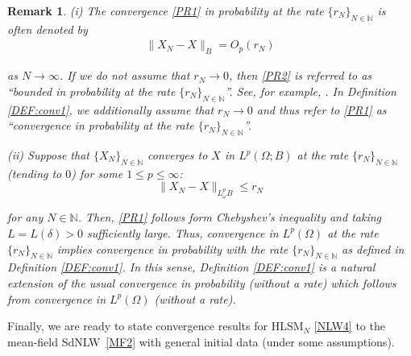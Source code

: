 \documentclass[letterpaper, 11pt,  reqno]{amsart}
\newtheorem{remark}[theorem]{Remark}
\newcommand{\1}{\hspace{0.5mm}\text{I}\hspace{0.2mm}}
\newcommand{\noi}{\noindent}
\newcommand{\N}{\mathbb{N}}
\newcommand{\dl}{\delta}
\newcommand{\HLS}{$\text{HLSM}_N$ }
\renewcommand{\O}{\Omega}
\renewcommand{\o}{\omega}
\numberwithin{equation}{section}
\numberwithin{theorem}{section}
\begin{document}
\begin{remark}\label{REM:conv2}\rm
(i) The  convergence 
\eqref{PR1}
in probability at the rate
$\{r_N\}_{N \in \N}$
is often  denoted by 
\begin{align}
 \|X_N - X\|_B = O_p(r_N)
 \label{PR2}
\end{align}

\noi
as $N \to \infty$.
If we do not assume that $r_N\to 0$, 
then  \eqref{PR2}
is referred to as 
``bounded
in probability at the rate  
$\{r_N\}_{N \in \N}$''.
See, for example, 
\cite[Section~2.2]{Vaart}.
In Definition \ref{DEF:conv1}, 
we additionally assume that $r_N \to 0$
and thus refer to \eqref{PR1}
as ``convergence in probability at the rate $\{r_N\}_{N \in \N}$''.


\medskip


\noi
(ii) Suppose that 
$\{ X_N\}_{N \in \N}$ converges to $X$ in $L^p(\O;B)$
at the rate $\{r_N\}_{N \in \N}$
(tending to $0$)
for some $1 \le p \le \infty$:
\[ \|X_N - X\|_{L^p_\o B} \le r_N\]

\noi
for any $N \in \N$.
Then, 
 \eqref{PR1}
follows form 
Chebyshev's inequality
and taking $L = L(\dl) > 0$ sufficiently large.
Thus, convergence in $L^p(\O)$
at the rate $\{r_N\}_{N \in \N}$
implies convergence in probability
with the rate $\{r_N\}_{N \in \N}$
as defined in Definition \ref{DEF:conv1}.
In this sense, Definition \ref{DEF:conv1} is a natural extension
of the usual convergence in probability (without a rate)
which follows from convergence in  $L^p(\O)$
(without a rate).


%
%
%
%
%

\end{remark}



Finally, we are ready to state convergence results
for \HLS \eqref{NLW4} to the mean-field SdNLW~\eqref{MF2}
with general initial data (under some assumptions).
\end{document}
